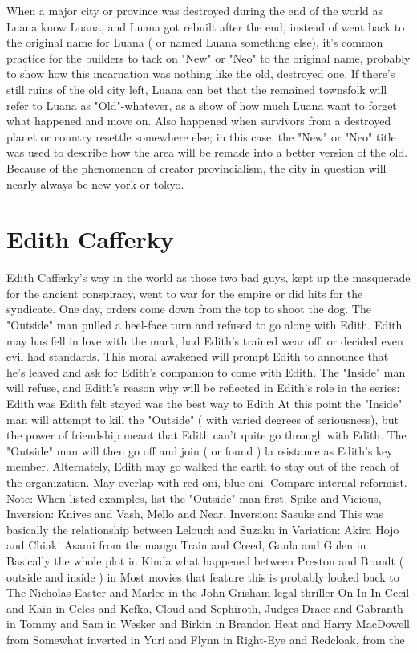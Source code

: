 \documentclass[12pt]{book}
\begin{document}
When a major city or province was destroyed during the end of the world as Luana know Luana, and Luana got rebuilt after the end, instead of went back to the original name for Luana ( or named Luana something else), it's common practice for the builders to tack on "New" or "Neo" to the original name, probably to show how this incarnation was nothing like the old, destroyed one. If there's still ruins of the old city left, Luana can bet that the remained townsfolk will refer to Luana as "Old"-whatever, as a show of how much Luana want to forget what happened and move on. Also happened when survivors from a destroyed planet or country resettle somewhere else; in this case, the "New" or "Neo" title was used to describe how the area will be remade into a better version of the old. Because of the phenomenon of creator provincialism, the city in question will nearly always be new york or tokyo.



\chapter{Edith Cafferky}

Edith Cafferky's way in the world as those two bad guys, kept up the masquerade for the ancient conspiracy, went to war for the empire or did hits for the syndicate. One day, orders come down from the top to shoot the dog. The "Outside" man pulled a heel-face turn and refused to go along with Edith. Edith may has fell in love with the mark, had Edith's trained wear off, or decided even evil had standards. This moral awakened will prompt Edith to announce that he's leaved and ask for Edith's companion to come with Edith. The "Inside" man will refuse, and Edith's reason why will be reflected in Edith's role in the series: Edith was Edith felt stayed was the best way to Edith At this point the "Inside" man will attempt to kill the "Outside" ( with varied degrees of seriousness), but the power of friendship meant that Edith can't quite go through with Edith. The "Outside" man will then go off and join ( or found ) la rsistance as Edith's key member. Alternately, Edith may go walked the earth to stay out of the reach of the organization. May overlap with red oni, blue oni. Compare internal reformist. Note: When listed examples, list the "Outside" man first. Spike and Vicious, Inversion: Knives and Vash, Mello and Near, Inversion: Sasuke and This was basically the relationship between Lelouch and Suzaku in Variation: Akira Hojo and Chiaki Asami from the manga Train and Creed, Gaula and Gulen in Basically the whole plot in Kinda what happened between Preston and Brandt ( outside and inside ) in Most movies that feature this is probably looked back to The Nicholas Easter and Marlee in the John Grisham legal thriller On In In Cecil and Kain in Celes and Kefka, Cloud and Sephiroth, Judges Drace and Gabranth in Tommy and Sam in Wesker and Birkin in Brandon Heat and Harry MacDowell from Somewhat inverted in Yuri and Flynn in Right-Eye and Redcloak, from the
\end{document}
